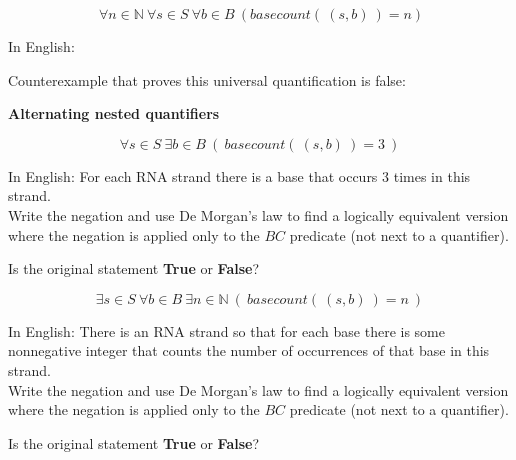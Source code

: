 \documentclass[12pt, oneside]{article}
\newcommand{\A}[0]{\texttt{A}}
\newcommand{\G}[0]{\texttt{G}}
\newcommand{\U}[0]{\texttt{U}}
\begin{document}
\vspace{30pt}



\vfill

\[
    ~\forall n \in \mathbb{N} ~\forall s \in S ~\forall b \in B  ~(basecount(~(s,b)~) = n)
\]

In English: \phantom{There exists an ordered $3$-tuple 
at which the predicate $BC$ evaluates to $T$.}

\vspace{30pt}

Counterexample that proves this universal quantification is false:
\phantom{$(\G\G, \G, 3)$ or $(\G\A\U\G, \G, 2)$)}

\vspace{30pt}



\vfill \newpage


{\bf Alternating nested quantifiers}

$$\forall s \in S ~\exists b\in B ~(~basecount(~(s,b)~) = 3~)$$

In English: For each RNA strand there is a base that occurs 3 times in this strand.\\

Write the negation and use De Morgan's law to find a 
logically equivalent version where the negation is applied only to the 
$BC$ predicate (not next to a quantifier).

\vspace{60pt}


Is the original statement {\bf True} or {\bf False}?



\vfill



$$\exists s \in S ~\forall b \in B ~\exists n \in \mathbb{N} ~(~basecount(~(s,b)~) = n~)$$

In English: There is an RNA strand so that for each base there is some nonnegative
integer that counts the number of occurrences of that base in this strand.\\

Write the negation and use De Morgan's law to find a 
logically equivalent version where the negation is applied only to the 
$BC$ predicate (not next to a quantifier).

\vspace{60pt}


Is the original statement {\bf True} or {\bf False}?
\end{document}
